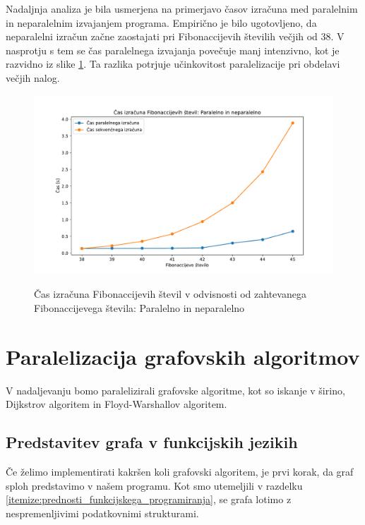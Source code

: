 \documentclass[mat1, tisk]{fmfdelo}
\begin{document}
Nadaljnja analiza je bila usmerjena na primerjavo časov izračuna med paralelnim in neparalelnim izvajanjem programa. 
Empirično je bilo ugotovljeno, da neparalelni izračun začne zaostajati pri Fibonaccijevih številih večjih od 38. 
V nasprotju s tem se čas paralelnega izvajanja povečuje manj intenzivno, kot je razvidno iz slike
\ref{fig:fib_par_v_odvisnosti_od_n}. Ta razlika potrjuje učinkovitost paralelizacije pri obdelavi večjih nalog.

\begin{figure}[h!]
  \centering
  \caption{Čas izračuna Fibonaccijevih števil v odvisnosti od zahtevanega Fibonaccijevega števila: Paralelno in neparalelno}
  \includegraphics[width=15cm]{slike/fib_par_v_odvisnosti_od_n.pdf}
  \label{fig:fib_par_v_odvisnosti_od_n}
\end{figure}


\section{Paralelizacija grafovskih algoritmov}

V nadaljevanju bomo paralelizirali grafovske algoritme, kot so iskanje v širino, Dijkstrov algoritem in Floyd-Warshallov algoritem.

\subsection{Predstavitev grafa v funkcijskih jezikih}

Če želimo implementirati kakršen koli grafovski algoritem, je prvi korak, da graf sploh predstavimo v našem programu.
Kot smo utemeljili v razdelku \ref{itemize:prednosti_funkcijskega_programiranja}, se grafa lotimo z nespremenljivimi
podatkovnimi strukturami.
\end{document}
